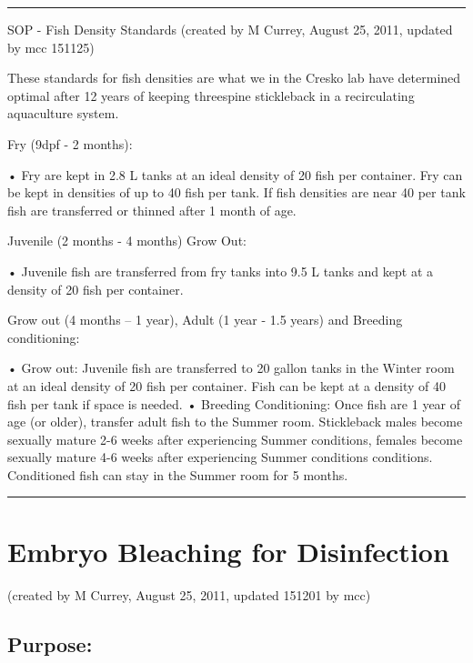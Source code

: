 \documentclass[
]{book}
\begin{document}
\begin{center}\rule{0.5\linewidth}{0.5pt}\end{center}

SOP - Fish Density Standards
(created by M Currey, August 25, 2011, updated by mcc 151125)

These standards for fish densities are what we in the Cresko lab have determined optimal after 12 years of keeping threespine stickleback in a recirculating aquaculture system.

Fry (9dpf - 2 months):

• Fry are kept in 2.8 L tanks at an ideal density of 20 fish per container. Fry can be kept in densities of up to 40 fish per tank. If fish densities are near 40 per tank fish are transferred or thinned after 1 month of age.

Juvenile (2 months - 4 months) Grow Out:

• Juvenile fish are transferred from fry tanks into 9.5 L tanks and kept at a density of 20 fish per container.

Grow out (4 months -- 1 year), Adult (1 year - 1.5 years) and Breeding conditioning:

• Grow out: Juvenile fish are transferred to 20 gallon tanks in the Winter room at an ideal density of 20 fish per container. Fish can be kept at a density of 40 fish per tank if space is needed.
• Breeding Conditioning: Once fish are 1 year of age (or older), transfer adult fish to the Summer room. Stickleback males become sexually mature 2-6 weeks after experiencing Summer conditions, females become sexually mature 4-6 weeks after experiencing Summer conditions conditions. Conditioned fish can stay in the Summer room for 5 months.

\begin{center}\rule{0.5\linewidth}{0.5pt}\end{center}

\hypertarget{embryo-bleaching-for-disinfection}{%
\section{Embryo Bleaching for Disinfection}\label{embryo-bleaching-for-disinfection}}

(created by M Currey, August 25, 2011, updated 151201 by mcc)

\hypertarget{purpose}{%
\subsection{Purpose:}\label{purpose}}
\end{document}
